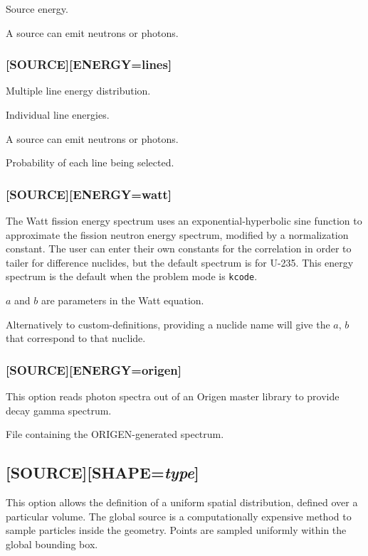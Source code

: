 \documentclass[10pt]{article}
\newcounter{subsubsubsection}[subsubsection]
\begin{document}
Source energy.

A source can emit neutrons or photons. 

\subsubsection{[SOURCE][ENERGY=lines]}
Multiple line energy distribution.

Individual line energies. 

A source can emit neutrons or photons. 

Probability of each line being selected.

\subsubsection{[SOURCE][ENERGY=watt]}
The Watt fission energy spectrum uses an exponential-hyperbolic sine function to approximate the fission neutron energy spectrum, modified by a normalization constant. The user can enter their own constants for the correlation in order to tailer for difference nuclides, but the default spectrum is for U-235. This energy spectrum is the default when the problem mode is \texttt{kcode}.

\(a\) and \(b\) are parameters in the Watt equation.

Alternatively to custom-definitions, providing a nuclide name will give the \(a\), \(b\) that correspond to that nuclide.

\subsubsection{[SOURCE][ENERGY=origen]}
This option reads photon spectra out of an Origen master library to provide decay gamma spectrum.

File containing the ORIGEN-generated spectrum.

\subsection{[SOURCE][SHAPE=\textit{type}]}
This option allows the definition of a uniform spatial distribution, defined over a particular volume. The global source is a computationally expensive method to sample particles inside the geometry. Points are sampled uniformly within the global bounding box.\newline
\end{document}
